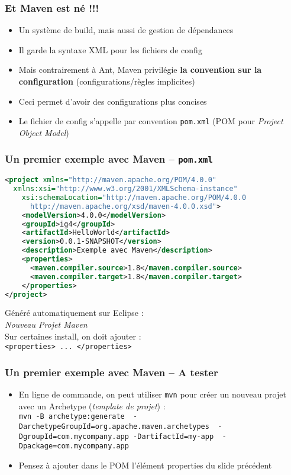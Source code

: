 \documentclass{beamer}
\begin{document}
\begin{frame}[fragile]
  \frametitle{Et Maven est né !!!}
\begin{itemize}
\item Un système de build, mais aussi de gestion de dépendances
\item Il garde la syntaxe XML pour les fichiers de config
\item Mais contrairement à Ant, Maven privilégie \textbf{la convention
    sur la configuration} (configurations/règles implicites)
\item Ceci permet d'avoir des configurations plus concises
\item Le fichier de config s'appelle par convention \texttt{pom.xml}
  (POM pour \textit{Project Object Model})
\end{itemize}
\end{frame}

\begin{frame}[fragile]
  \frametitle{Un premier exemple avec Maven -- \texttt{pom.xml} }
\begin{lstlisting}[language=XML,basicstyle=\tiny]  
<project xmlns="http://maven.apache.org/POM/4.0.0"
  xmlns:xsi="http://www.w3.org/2001/XMLSchema-instance"
    xsi:schemaLocation="http://maven.apache.org/POM/4.0.0 
      http://maven.apache.org/xsd/maven-4.0.0.xsd">
    <modelVersion>4.0.0</modelVersion>
    <groupId>ig4</groupId>
    <artifactId>HelloWorld</artifactId>
    <version>0.0.1-SNAPSHOT</version>
    <description>Exemple avec Maven</description>
    <properties>
      <maven.compiler.source>1.8</maven.compiler.source>
      <maven.compiler.target>1.8</maven.compiler.target>
    </properties>
</project>
\end{lstlisting}
Généré automatiquement sur Eclipse :\\
\textit{Nouveau Projet Maven}\\
Sur certaines install, on doit ajouter :\\
\texttt{<properties> ... </properties>}
\vspace{4.5cm}
\end{frame}

\begin{frame}[fragile]
  \frametitle{Un premier exemple avec Maven -- A tester}
\begin{itemize}
\item En ligne de commande, on peut utiliser \texttt{mvn} pour créer
  un nouveau projet avec un Archetype (\textit{template de projet}) :\\
  \texttt{mvn -B archetype:generate \
    -DarchetypeGroupId=org.apache.maven.archetypes \
    -DgroupId=com.mycompany.app -DartifactId=my-app \
    -Dpackage=com.mycompany.app}
\item Pensez à ajouter dans le POM l'élément properties du slide
  précédent
\end{itemize}  
\end{frame}
\end{document}
